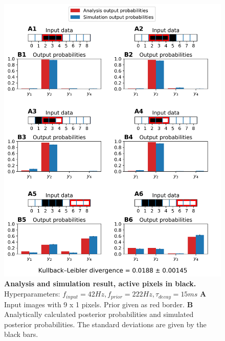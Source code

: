 \begin{figure}
  \includegraphics[width=\linewidth]{figures/1D/1D_42_222_15.png}
     \caption{\textbf{Analysis and simulation result, active pixels in black. } Hyperparameters: $f_{input} = 42 Hz, f_{prior} = 222 Hz, \tau_{decay} = 15 ms$ \textbf{A} Input images with 9 x 1 pixels. Prior given as red border. \textbf{B} Analytically calculated posterior probabilities and simulated posterior probabilities. The standard deviations are given by the black bars.}
  \label{fig:1D_42_222_15}
\end{figure}

